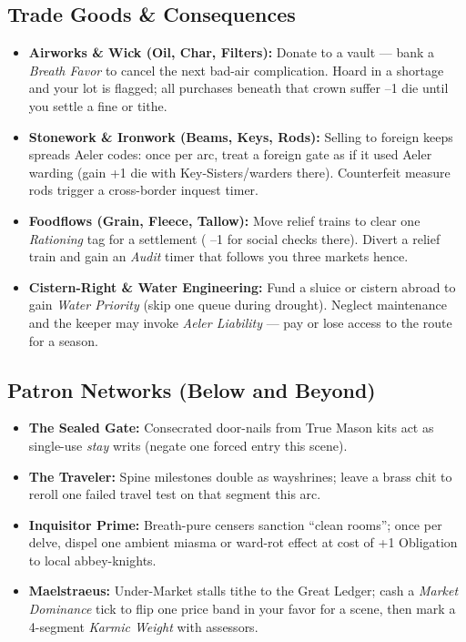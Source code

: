 \subsection*{Trade Goods \& Consequences}
\begin{itemize}
  \item \textbf{Airworks \& Wick (Oil, Char, Filters):} Donate to a vault --- bank a \emph{Breath Favor} to cancel the next bad-air complication. Hoard in a shortage and your lot is flagged; all purchases beneath that crown suffer --1 die until you settle a fine or tithe.
  \item \textbf{Stonework \& Ironwork (Beams, Keys, Rods):} Selling to foreign keeps spreads Aeler codes: once per arc, treat a foreign gate as if it used Aeler warding (gain +1 die with Key-Sisters/warders there). Counterfeit measure rods trigger a cross-border inquest timer.
  \item \textbf{Foodflows (Grain, Fleece, Tallow):} Move relief trains to clear one \emph{Rationing} tag for a settlement (\DV{} --1 for social checks there). Divert a relief train and gain an \emph{Audit} timer that follows you three markets hence.
  \item \textbf{Cistern-Right \& Water Engineering:} Fund a sluice or cistern abroad to gain \emph{Water Priority} (skip one queue during drought). Neglect maintenance and the keeper may invoke \emph{Aeler Liability} --- pay or lose access to the route for a season.
\end{itemize}

\subsection*{Patron Networks (Below and Beyond)}
\begin{itemize}
  \item \textbf{The Sealed Gate:} Consecrated door-nails from True Mason kits act as single-use \emph{stay} writs (negate one forced entry this scene).
  \item \textbf{The Traveler:} Spine milestones double as wayshrines; leave a brass chit to reroll one failed travel test on that segment this arc.
  \item \textbf{Inquisitor Prime:} Breath-pure censers sanction ``clean rooms''; once per delve, dispel one ambient miasma or ward-rot effect at cost of +1 Obligation to local abbey-knights.
  \item \textbf{Maelstraeus:} Under-Market stalls tithe to the Great Ledger; cash a \emph{Market Dominance} tick to flip one price band in your favor for a scene, then mark a 4-segment \emph{Karmic Weight} with assessors.
\end{itemize}


